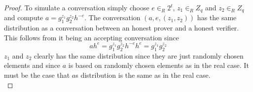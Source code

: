 \begin{itemize}
\begin{proof}
  To simulate a conversation simply choose $e \in_R 2^{t}$, $z_1 \in_R Z_q$ and $z_2 \in_R Z_q$ and compute $a = g_1^{z_1}g_2^{z_2}h^{-e}$. The conversation $(a, e, (z_1,z_2))$ has the same distribution as a conversation between an honest prover and a honest verifier. This follows from it being an accepting conversation since
  \[
    ah^e = g_1^{z_1}g_2^{z_2}h^{-e}h^e = g_1^{z_1} g_2^{z_2}
  \]
  $z_1$ and $z_2$ clearly has the same distribution since they are just randomly chosen elements and since $a$ is based on randomly chosen elements as in the real case. It must be the case that $a$s distribution is the same as in the real case. \smallskip \\
  \end{proof}
\end{itemize}

\newpage

